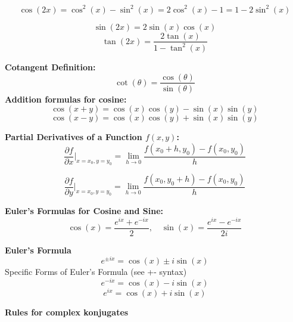 \documentclass[a4paper,11pt]{article}
\renewcommand{\textbf}[1]{{\scriptsize	\bfseries #1}}
\begin{document}
\begin{footnotesize}
\begin{multicols}{2}
\begin{minipage}{\linewidth}
\[
\cos(2x) = \cos^2(x) - \sin^2(x) = 2\cos^2(x) - 1 = 1 - 2\sin^2(x)
\]

\[
\sin(2x) = 2\sin(x)\cos(x)
\]
\[
\tan(2x) = \frac{2\tan(x)}{1-\tan^2(x)}
\]
\end{minipage}
\begin{minipage}{\linewidth}
\textbf{Cotangent Definition:}
\[
\cot(\theta) = \frac{\cos(\theta)}{\sin(\theta)}
\]
\textbf{Addition formulas for cosine:}
\[
\cos(x + y) = \cos(x)\cos(y) - \sin(x)\sin(y)
\]
\[
\cos(x - y) = \cos(x)\cos(y) + \sin(x)\sin(y)
\]

\end{minipage}
\begin{minipage}{\linewidth}

\textbf{Partial Derivatives of a Function $f(x, y)$:} \\[-0.2cm]
\[
\frac{\partial f}{\partial x} \Bigg|_{x=x_0, y=y_0} = \lim_{h \to 0} \frac{f(x_0 + h, y_0) - f(x_0, y_0)}{h}
\]

\[
\frac{\partial f}{\partial y} \Bigg|_{x=x_0, y=y_0} = \lim_{h \to 0} \frac{f(x_0, y_0 + h) - f(x_0, y_0)}{h}
\]

\end{minipage}

\begin{minipage}{\linewidth}
\textbf{Euler's Formulas for Cosine and Sine:}
\[
\cos(x) = \frac{e^{ix} + e^{-ix}}{2}, \quad \sin(x) = \frac{e^{ix} - e^{-ix}}{2i}
\]
\end{minipage}

 \begin{minipage}{\linewidth}

\textbf{Euler's Formula} \\
\[
    e^{\pm ix} = \cos(x) \pm i \sin(x)
\]
Specific Forms of Euler's Formula (see +- syntax)
\[
    e^{-ix} = \cos(x) - i \sin(x)
\]
\[
    e^{ix} = \cos(x) + i \sin(x)
\]



\end{minipage}

\begin{minipage}{\linewidth}

\textbf{Rules for complex konjugates}


\end{minipage}
\end{multicols}
\end{footnotesize}
\end{document}
